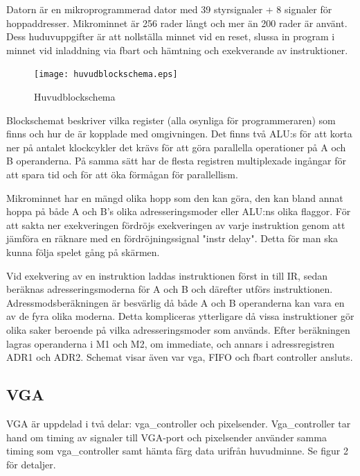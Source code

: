 \documentclass[11pt]{article}
\begin{document}
Datorn är en mikroprogrammerad dator med 39 styrsignaler + 8 signaler för hoppaddresser. Mikrominnet är 256 rader långt och mer än 200 rader är använt. Dess huduvuppgifter är att nollställa minnet vid en reset, slussa in program i minnet vid inladdning via fbart och hämtning och exekverande av instruktioner.

\begin{figure}[h]
    \begin{center}
        \texttt{[image: huvudblockschema.eps]}
        \caption{Huvudblockschema}
        \label{fig:huvud}
    \end{center}
\end{figure}

Blockschemat beskriver vilka register (alla osynliga för programmeraren) som finns och hur de är kopplade med omgivningen. Det finns två ALU:s för att korta ner på antalet klockcykler det krävs för att göra parallella operationer på A och B operanderna. På samma sätt har de flesta registren multiplexade ingångar för att spara tid och för att öka förmågan för parallellism.

Mikrominnet har en mängd olika hopp som den kan göra, den kan bland annat hoppa på både A och B's olika adresseringsmoder eller ALU:ns olika flaggor. För att sakta ner exekveringen fördröjs exekveringen av varje instruktion genom att jämföra en räknare med en fördröjningssignal "instr delay". Detta för man ska kunna följa spelet gång på skärmen.

Vid exekvering av en instruktion laddas instruktionen först in till IR, sedan beräknas adresseringsmoderna för A och B och därefter utförs instruktionen. Adressmodsberäkningen är besvärlig då både A och B operanderna kan vara en av de fyra olika moderna. Detta kompliceras ytterligare då vissa instruktioner gör olika saker beroende på vilka adresseringsmoder som används. Efter beräkningen lagras operanderna i M1 och M2, om immediate, och annars i adressregistren ADR1 och ADR2. Schemat visar även var vga, FIFO och fbart controller ansluts.

\subsection{VGA}

VGA är uppdelad i två delar: vga\_controller och pixelsender. Vga\_controller tar hand om timing av signaler till VGA-port och pixelsender använder samma timing som vga\_controller samt hämta färg data urifrån huvudminne. Se figur 2 för detaljer.
\end{document}
